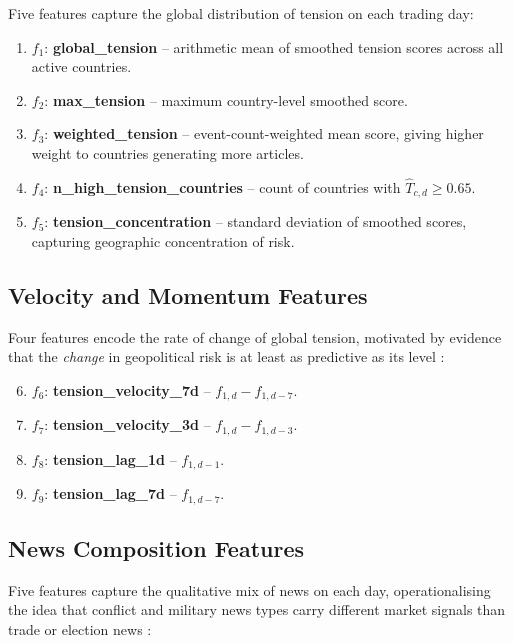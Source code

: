 \documentclass[12pt,a4paper]{report}
\begin{document}
Five features capture the global distribution of tension on each trading day:

\begin{enumerate}
  \item $f_1$: \textbf{global\_tension} -- arithmetic mean of smoothed
        tension scores across all active countries.
  \item $f_2$: \textbf{max\_tension} -- maximum country-level smoothed
        score.
  \item $f_3$: \textbf{weighted\_tension} -- event-count-weighted mean
        score, giving higher weight to countries generating more articles.
  \item $f_4$: \textbf{n\_high\_tension\_countries} -- count of countries
        with $\hat{T}_{c,d} \geq 0.65$.
  \item $f_5$: \textbf{tension\_concentration} -- standard deviation of
        smoothed scores, capturing geographic concentration of risk.
\end{enumerate}

\subsection{Velocity and Momentum Features}

Four features encode the rate of change of global tension, motivated by
evidence that the \emph{change} in geopolitical risk is at least as
predictive as its level \cite{caldara2022, bloom2009}:

\begin{enumerate}
  \setcounter{enumi}{5}
  \item $f_6$: \textbf{tension\_velocity\_7d} -- $f_{1,d} - f_{1,d-7}$.
  \item $f_7$: \textbf{tension\_velocity\_3d} -- $f_{1,d} - f_{1,d-3}$.
  \item $f_8$: \textbf{tension\_lag\_1d} -- $f_{1,d-1}$.
  \item $f_9$: \textbf{tension\_lag\_7d} -- $f_{1,d-7}$.
\end{enumerate}

\subsection{News Composition Features}

Five features capture the qualitative mix of news on each day,
operationalising the idea that conflict and military news types carry
different market signals than trade or election news \cite{caldara2022,
manela2017}:
\end{document}
